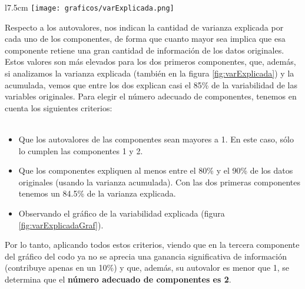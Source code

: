 \documentclass[a4paper,onecolumn]{extarticle}
\begin{document}
\begin{sloppypar}
\begin{wrapfigure}[14]{l}{7.5cm}
    \texttt{[image: graficos/varExplicada.png]}
    \small{\caption{Variabilidad Explicada} \label{fig:varExplicadaGraf}}
\end{wrapfigure} 
Respecto a los autovalores, nos indican la cantidad de varianza explicada por cada uno de los componentes, de forma que cuanto mayor sea implica que esa 
componente retiene una gran cantidad de información de los datos originales. Estos valores son más elevados para los dos primeros componentes, que, además,
si analizamos la varianza explicada (también en la figura \ref{fig:varExplicada}) y la acumulada, vemos que entre los dos explican casi el 85\% de la 
variabilidad de las variables originales. Para elegir el número adecuado de componentes, tenemos en cuenta los siguientes criterios:
\\
\\
\begin{itemize}
    \item Que los autovalores de las componentes sean mayores a 1. En este caso, sólo lo cumplen las componentes 1 y 2.
    \item Que los componentes expliquen al menos entre el 80\% y el 90\% de los datos originales (usando la varianza acumulada). Con las dos primeras
    componentes tenemos un 84.5\% de la varianza explicada.
    \item Observando el gráfico de la variabilidad explicada (figura \ref{fig:varExplicadaGraf}).
\end{itemize}

Por lo tanto, aplicando todos estos criterios, viendo que en la tercera componente del gráfico del codo ya no se aprecia una ganancia significativa de 
información (contribuye apenas en un 10\%) y que, además, su autovalor es menor que 1, se determina que el \textbf{número adecuado de componentes es 2}.


\end{sloppypar}
\end{document}
